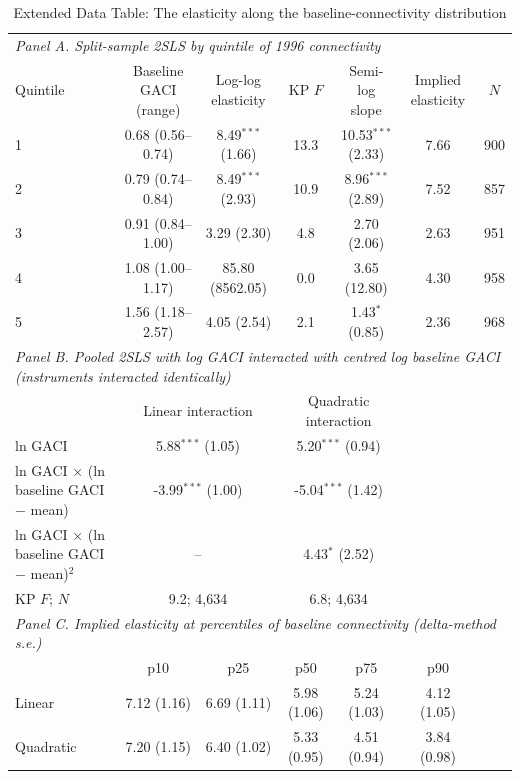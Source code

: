 \begin{table}[htbp]
\centering
\begin{threeparttable}
\caption{Extended Data Table: The elasticity along the baseline-connectivity distribution}
\label{tab:gradient}
\footnotesize
\begin{tabular}{lcccccc}
\toprule
\multicolumn{7}{l}{\textit{Panel A. Split-sample 2SLS by quintile of 1996 connectivity}} \\
Quintile & Baseline GACI (range) & Log-log elasticity & KP $F$ & Semi-log slope & Implied elasticity & $N$ \\
\midrule
  1 & 0.68 (0.56--0.74) & 8.49$^{***}$ (1.66) & 13.3 & 10.53$^{***}$ (2.33) & 7.66 & 900 \\
  2 & 0.79 (0.74--0.84) & 8.49$^{***}$ (2.93) & 10.9 & 8.96$^{***}$ (2.89) & 7.52 & 857 \\
  3 & 0.91 (0.84--1.00) & 3.29 (2.30) & 4.8 & 2.70 (2.06) & 2.63 & 951 \\
  4 & 1.08 (1.00--1.17) & 85.80 (8562.05) & 0.0 & 3.65 (12.80) & 4.30 & 958 \\
  5 & 1.56 (1.18--2.57) & 4.05 (2.54) & 2.1 & 1.43$^{*}$ (0.85) & 2.36 & 968 \\
\midrule
\multicolumn{7}{l}{\textit{Panel B. Pooled 2SLS with log GACI interacted with centred log baseline GACI (instruments interacted identically)}} \\
 & \multicolumn{2}{c}{Linear interaction} & \multicolumn{2}{c}{Quadratic interaction} & & \\
  ln GACI & \multicolumn{2}{c}{5.88$^{***}$ (1.05)} & \multicolumn{2}{c}{5.20$^{***}$ (0.94)} & & \\
  ln GACI $\times$ (ln baseline GACI $-$ mean) & \multicolumn{2}{c}{-3.99$^{***}$ (1.00)} & \multicolumn{2}{c}{-5.04$^{***}$ (1.42)} & & \\
  ln GACI $\times$ (ln baseline GACI $-$ mean)$^2$ & \multicolumn{2}{c}{--} & \multicolumn{2}{c}{4.43$^{*}$ (2.52)} & & \\
  KP $F$; $N$ & \multicolumn{2}{c}{9.2; 4,634} & \multicolumn{2}{c}{6.8; 4,634} & & \\
\midrule
\multicolumn{7}{l}{\textit{Panel C. Implied elasticity at percentiles of baseline connectivity (delta-method s.e.)}} \\
 & p10 & p25 & p50 & p75 & p90 & \\
  Linear & 7.12 (1.16) & 6.69 (1.11) & 5.98 (1.06) & 5.24 (1.03) & 4.12 (1.05) & \\
  Quadratic & 7.20 (1.15) & 6.40 (1.02) & 5.33 (0.95) & 4.51 (0.94) & 3.84 (0.98) & \\

\end{tabular}
\end{threeparttable}
\end{table}

